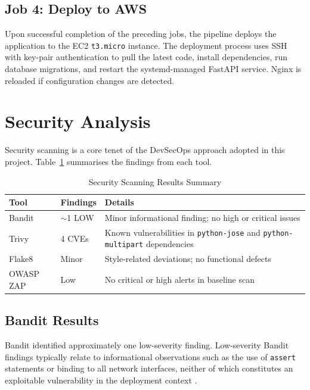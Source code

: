 \documentclass[conference]{IEEEtran}
\begin{document}
\subsection{Job 4: Deploy to AWS}

Upon successful completion of the preceding jobs, the pipeline deploys the application to the EC2 \texttt{t3.micro} instance. The deployment process uses SSH with key-pair authentication to pull the latest code, install dependencies, run database migrations, and restart the systemd-managed FastAPI service. Nginx is reloaded if configuration changes are detected.

\section{Security Analysis}
\label{sec:security}

Security scanning is a core tenet of the DevSecOps approach adopted in this project. Table~\ref{tab:security} summarises the findings from each tool.

\begin{table}[htbp]
\centering
\caption{Security Scanning Results Summary}
\label{tab:security}
\begin{tabular}{@{}p{1.8cm}p{1.2cm}p{4.5cm}@{}}
\toprule
\textbf{Tool} & \textbf{Findings} & \textbf{Details} \\
\midrule
Bandit & $\sim$1 LOW & Minor informational finding; no high or critical issues \\
Trivy & 4 CVEs & Known vulnerabilities in \texttt{python-jose} and \texttt{python-multipart} dependencies \\
Flake8 & Minor & Style-related deviations; no functional defects \\
OWASP ZAP & Low & No critical or high alerts in baseline scan \\
\bottomrule
\end{tabular}
\end{table}

\subsection{Bandit Results}

Bandit identified approximately one low-severity finding. Low-severity Bandit findings typically relate to informational observations such as the use of \texttt{assert} statements or binding to all network interfaces, neither of which constitutes an exploitable vulnerability in the deployment context \cite{bandit2023docs}.
\end{document}

